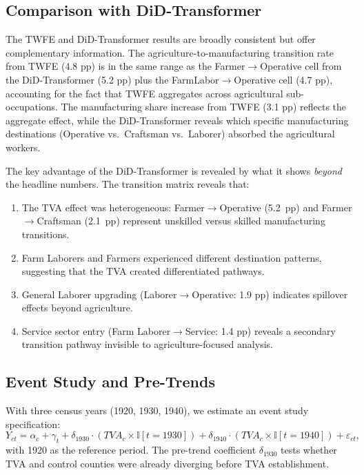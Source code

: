 \documentclass[12pt]{article}
\newcommand{\ind}{\mathbb{I}}
\begin{document}
\subsection{Comparison with DiD-Transformer}

The TWFE and DiD-Transformer results are broadly consistent but offer complementary information. The agriculture-to-manufacturing transition rate from TWFE (4.8 pp) is in the same range as the Farmer$\to$Operative cell from the DiD-Transformer (5.2 pp) plus the FarmLabor$\to$Operative cell (4.7 pp), accounting for the fact that TWFE aggregates across agricultural sub-occupations. The manufacturing share increase from TWFE (3.1 pp) reflects the aggregate effect, while the DiD-Transformer reveals which specific manufacturing destinations (Operative vs.\ Craftsman vs.\ Laborer) absorbed the agricultural workers.

The key advantage of the DiD-Transformer is revealed by what it shows \textit{beyond} the headline numbers. The transition matrix reveals that:
\begin{enumerate}
\item The TVA effect was heterogeneous: Farmer$\to$Operative (5.2~pp) and Farmer$\to$Craftsman (2.1~pp) represent unskilled versus skilled manufacturing transitions.
\item Farm Laborers and Farmers experienced different destination patterns, suggesting that the TVA created differentiated pathways.
\item General Laborer upgrading (Laborer$\to$Operative: 1.9 pp) indicates spillover effects beyond agriculture.
\item Service sector entry (Farm Laborer$\to$Service: 1.4 pp) reveals a secondary transition pathway invisible to agriculture-focused analysis.
\end{enumerate}

\subsection{Event Study and Pre-Trends}

With three census years (1920, 1930, 1940), we estimate an event study specification:
\begin{equation}
Y_{ct} = \alpha_c + \gamma_t + \delta_{1930} \cdot (TVA_c \times \ind[t = 1930]) + \delta_{1940} \cdot (TVA_c \times \ind[t = 1940]) + \varepsilon_{ct},
\end{equation}
with 1920 as the reference period. The pre-trend coefficient $\delta_{1930}$ tests whether TVA and control counties were already diverging before TVA establishment.
\end{document}
